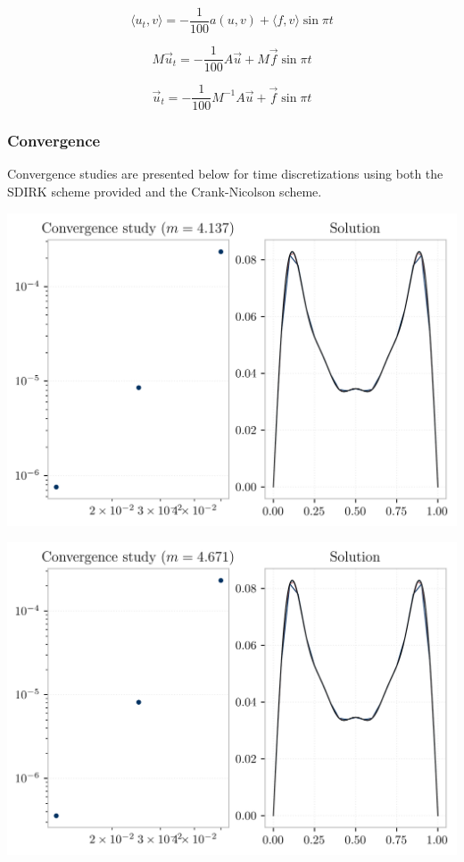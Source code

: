 \documentclass[
  11pt,
]{article}
\let\origfigure\figure
\let\endorigfigure\endfigure
\renewenvironment{figure}[1][2] {
    \expandafter\origfigure\expandafter[H]
} {
    \endorigfigure
}
\begin{document}
\[
\langle u_{t}, v\rangle = -\frac{1}{100} a(u, v)+\langle f, v\rangle \sin \pi t
\]

\[
M \vec{u}_{t}=-\frac{1}{100} A \vec{u} + M \vec{f} \sin \pi t
\]

\[
\vec{u}_{t}=-\frac{1}{100} {M}^{-1} A \vec{u}+\vec{f} \sin \pi t
\]

\hypertarget{convergence-1}{%
\subsubsection{Convergence}\label{convergence-1}}

Convergence studies are presented below for time discretizations using
both the SDIRK scheme provided and the Crank-Nicolson scheme.

\begin{figure}
\centering
\includegraphics{../img/p3b-conv.png}
\caption{Convergence study.}
\end{figure}

\begin{figure}
\centering
\includegraphics{../img/p3b-conv-cn.png}
\caption{Convergence study for Crank-Nicolson tableau.}
\end{figure}
\end{document}
